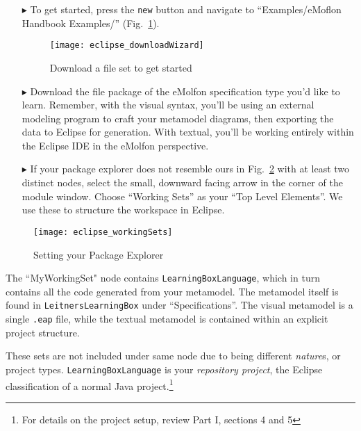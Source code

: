 \begin{itemize}

\item[$\blacktriangleright$] To get started, press the \texttt{new} button and navigate to ``Examples/eMoflon Handbook Examples/''
(Fig.~\ref{fig:downloadWizard}).

\begin{figure}[htbp]
	\centering
  \texttt{[image: eclipse\_downloadWizard]}
	\caption{Download a file set to get started}
	\label{fig:downloadWizard}
\end{figure}

\item[$\blacktriangleright$] Download the file package of the eMolfon specification type you'd like to learn. Remember, with the visual syntax, you'll be
using an external modeling program to craft your metamodel diagrams, then exporting the data to Eclipse for generation. With textual, you'll be working entirely
within the Eclipse IDE in the eMolfon perspective.

\newpage

\vspace*{0.5cm}

\item[$\blacktriangleright$] If your package explorer does not resemble ours in Fig.~\ref{fig:workingSets} with at least two distinct nodes, select the
small, downward facing arrow in the corner of the module window. Choose ``Working Sets'' as your ``Top Level Elements''. We use these to structure the workspace
in Eclipse.

\vspace{0.75cm}

\end{itemize}

\begin{figure}[htbp]
	\centering
  \texttt{[image: eclipse\_workingSets]}
	\caption{Setting your Package Explorer \update}
	\label{fig:workingSets}
\end{figure}

The ``MyWorkingSet" node contains \texttt{Learn\-ing\-Box\-Lang\-uage}, which in turn contains all the code generated from your metamodel. The metamodel itself
is found in \texttt{Leit\-ners\-Learn\-ing\-Box} under ``Specifications''. The visual metamodel is a single \texttt{.eap} file, while the textual metamodel is
contained within an explicit project structure. 

These sets are not included under same node due to being different \emph{nature}s, or project types. \texttt{Learning\-Box\-Language} is your
\emph{repository project}, the Eclipse classification of a normal Java project.\footnote{For details on the project setup, review Part I, sections 4 and 5} 

